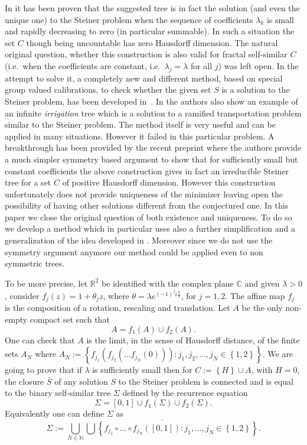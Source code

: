 \documentclass{amsart}
\newcommand{\RR}{\mathbb R}
\newcommand{\CC}{\mathbb C}
\newcommand{\NN}{\mathbb N}
\newcommand{\ENCLOSE}[1]{\left\{#1\right\}}
\theoremstyle{definition}
\theoremstyle{remark}
\begin{document}
In \cite{PaoSteTep15} it has been proven that 
the suggested tree is in fact the solution (and even the unique one) 
to the Steiner problem when the sequence of coefficients $\lambda_k$
is small and rapidly decreasing to zero (in particular summable).
In such a situation the set $C$ though being uncountable 
has zero Hausdorff dimension.
The natural original question, whether this construction is also valid 
for fractal self-similar $C$ (i.e.\ when the coefficients are constant,
i.e.\ $\lambda_j=\lambda$ for all $j$)
was left open.
In the attempt to solve it, a 
completely new and different method, based on special group valued calibrations,
to check whether the given set $S$ is a solution to the Steiner problem,
has been developed in~\cite{MarMas16a}.
In \cite{MarMas16b} the authors also show an example 
of an infinite \emph{irrigation} tree which is a solution to
a ramified transportation problem similar to the Steiner problem.
The method itself is very useful and can be applied in many situations.
However it failed in this particular problem.
A breakthrough has been provided by the recent preprint \cite{CheTep23}
where the authors provide a much simpler symmetry based argument to show that for 
sufficiently small but constant coefficients the above construction 
gives in fact an irreducible Steiner tree for a set $C$ 
of positive Hausdorff dimension.
However this construction unfortunately does not provide uniqueness of 
the minimizer leaving open the possibility of having other solutions 
different from the conjectured one.
In this paper 
we close the original question of both existence and uniqueness.
To do so we develop a method which in particular uses 
also a further simplification and a generalization of 
the idea developed in \cite{CheTep23}.
Moreover since we do not use the symmetry argument anymore our method 
could be applied even to non symmetric trees.

To be more precise, 
let $\RR^2$ be identified with the complex plane $\CC$
and given $\lambda>0$, 
consider $f_j(z) = 1 + \theta_j z$,
where $\theta = \lambda e^{(-1)^j i \frac \pi 3}$,
for $j=1,2$. 
The affine map $f_j$ is the composition of a rotation,
rescaling and translation. 
Let $A$ be the only non-empty compact set such that 
\[
  A = f_1(A) \cup f_2(A).  
\]
One can check that $A$ is the limit, 
in the sense of Hausdorff distance,
of the finite sets $A_N$ where $A_N:=\ENCLOSE{f_{j_1}(f_{j_2}(\dots f_{j_N}(0)))\colon 
j_1,j_2, \dots, j_N \in \ENCLOSE{1,2}}$.
We are going to prove that if $\lambda$ is sufficiently 
small then 
for $C:=\ENCLOSE{H}\cup A$, with $H=0$, the closure $\bar S$ of any solution 
$S$ to the Steiner problem 
is connected and is equal to the binary self-similar 
tree $\Sigma$ defined by the recurrence equation
\[
  \Sigma = [0,1] \cup f_1(\Sigma) \cup f_2(\Sigma).
\]
Equivalently one can define $\Sigma$ as
\[
  \Sigma := \overline{\bigcup_{N \in \NN}  
  \bigcup\ENCLOSE{f_{j_1}\circ \dots \circ f_{j_N}([0,1])\colon 
  j_1, \dots, j_N \in \ENCLOSE{1,2}}}.
\]
\end{document}
